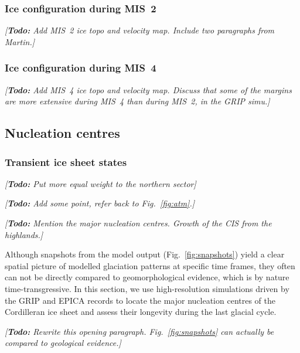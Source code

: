 \documentclass[tc, manuscript]{copernicus}
\newcommand{\todo}[1]{\emph{[\textbf{Todo:} #1]}}
\begin{document}
\subsubsection{Ice configuration during MIS~2}

\todo{Add MIS~2 ice topo and velocity map. Include two paragraphs from Martin.}

\subsubsection{Ice configuration during MIS~4}

\todo{Add MIS~4 ice topo and velocity map. Discuss that some of the margins
      are more extensive during MIS~4 than during MIS~2, in the GRIP simu.}

\subsection{Nucleation centres}

\subsubsection{Transient ice sheet states}

\todo{Put more equal weight to the northern sector}

\todo{Add some point, refer back to Fig.~\ref{fig:atm}.}

\todo{Mention the major nucleation centres. Growth of the CIS from the
      highlands.}

Although snapshots from the model output (Fig.~\ref{fig:snapshots}) yield a
clear spatial picture of modelled glaciation patterns at specific time frames,
they often can not be directly compared to geomorphological evidence, which is
by nature time-transgressive. In this section, we use high-resolution
simulations driven by the GRIP and EPICA records to locate the major nucleation
centres of the Cordilleran ice sheet and assess their longevity during the last
glacial cycle.

\todo{Rewrite this opening paragraph. Fig.~\ref{fig:snapshots} can actually be
      compared to geological evidence.}
\end{document}

